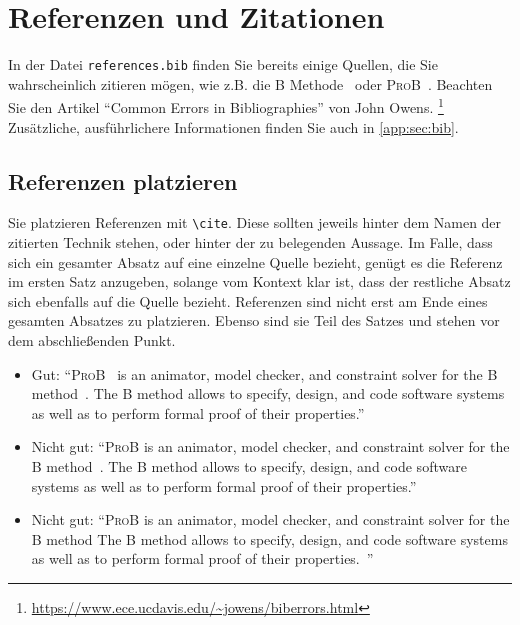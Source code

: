 \section{Referenzen und Zitationen}

In der Datei \texttt{references.bib} finden Sie bereits einige Quellen,
die Sie wahrscheinlich zitieren mögen,
wie z.B. die B Methode~\cite{abrial1996b,abrial2010modeling}
oder \textsc{ProB}~\cite{leuschel2003prob,leuschel2008prob}.
Beachten Sie den Artikel ``Common Errors in Bibliographies'' von John Owens.%
\footnote{\url{https://www.ece.ucdavis.edu/~jowens/biberrors.html}}
Zusätzliche, ausführlichere Informationen finden Sie auch in \cref{app:sec:bib}.


\subsection{Referenzen platzieren}

Sie platzieren Referenzen mit \texttt{\textbackslash{}cite{}}.
Diese sollten jeweils hinter dem Namen der zitierten Technik stehen,
oder hinter der zu belegenden Aussage.
Im Falle, dass sich ein gesamter Absatz auf eine einzelne Quelle bezieht,
genügt es die Referenz im ersten Satz anzugeben, solange vom Kontext klar ist,
dass der restliche Absatz sich ebenfalls auf die Quelle bezieht.
Referenzen sind nicht erst am Ende eines gesamten Absatzes zu platzieren.
Ebenso sind sie Teil des Satzes und stehen vor dem abschließenden Punkt.

\begin{itemize}
  \item Gut: \enquote{\textsc{ProB}~\cite{leuschel2003prob} is an
    animator, model checker, and constraint solver for the B method~\cite{abrial1996b}.
    The B method allows to specify, design, and code
    software systems as well as to perform formal proof of their properties.}
  \item Nicht gut: \enquote{\textsc{ProB} is an
    animator, model checker, and constraint solver for the B method~\cite{leuschel2003prob,abrial1996b}.
    The B method allows to specify, design, and code
    software systems as well as to perform formal proof of their properties.}
  \item Nicht gut: \enquote{\textsc{ProB} is an
    animator, model checker, and constraint solver for the B method
    The B method allows to specify, design, and code
    software systems as well as to perform formal proof of their properties.~\cite{leuschel2003prob,abrial1996b}}
\end{itemize}


